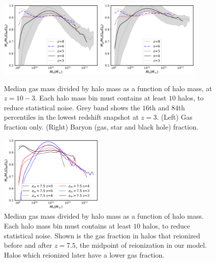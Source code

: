 \documentclass[fleqn,usenatbib]{mnras}
\begin{document}
\begin{figure}
\centering
  \includegraphics[width=0.45\textwidth]{plots/gmhms.pdf}
  \includegraphics[width=0.45\textwidth]{plots/gmhms-all.pdf}
  \caption{Median gas mass divided by halo mass as a function of halo mass, at $z=10-3$. Each halo mass bin must contains at least $10$ halos, to reduce statistical noise. Grey band shows the $16$th and $84$th percentiles in the lowest redshift snapshot at $z=3$. (Left) Gas fraction only. (Right) Baryon (gas, star and black hole) fraction. }
  \label{fig:gmhm}
\end{figure}

\begin{figure}
\centering
  \includegraphics[width=0.45\textwidth]{plots/gmhms_reion.pdf}
  \caption{Median gas mass divided by halo mass as a function of halo mass. Each halo mass bin must contains at least $10$ halos, to reduce statistical noise. Shown is the gas fraction in halos that reionized before and after $z=7.5$, the midpoint of reionization in our model. Halos which reionized later have a lower gas fraction.}
  \label{fig:gmhm_reion}
\end{figure}
\end{document}
